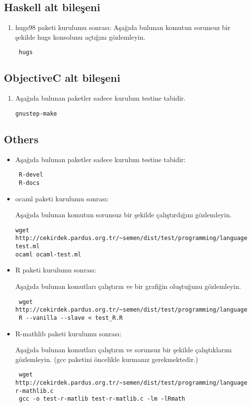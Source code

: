 \documentclass[a4paper,10pt]{article}
\begin{document}
\subsection{Haskell alt bileşeni}
\begin{enumerate}
 \item hugs98 paketi kurulumu sonrası:
Aşağıda bulunan komutun sorunsuz bir şekilde hugs konsolunu açtığını gözlemleyin.
\begin{verbatim}
 hugs
\end{verbatim}

\end{enumerate}

\subsection{ObjectiveC alt bileşeni}
\begin{enumerate}
\item Aşağıda bulunan paketler sadece kurulum testine tabidir.
\begin{verbatim}
gnustep-make
\end{verbatim}

\end{enumerate}


\subsection{Others}
\begin{itemize}
\item Aşağıda bulunan paketler sadece kurulum testine tabidir:

\begin{verbatim}
 R-devel
 R-docs
\end{verbatim}

\item ocaml paketi kurulumu sonrası:

Aşağıda bulunan komutun sorunsuz bir şekilde çalıştırdığını gözlemleyin.
\begin{verbatim}
wget http://cekirdek.pardus.org.tr/~semen/dist/test/programming/language/ocaml-test.ml 
ocaml ocaml-test.ml
\end{verbatim}

 \item R paketi kurulumu sonrası:

Aşağıda bulunan komutları çalıştırın ve bir grafiğin oluştuğunu gözlemleyin.
\begin{verbatim}
 wget http://cekirdek.pardus.org.tr/~semen/dist/test/programming/language/test_R.R
 R --vanilla --slave < test_R.R
\end{verbatim}
\item R-mathlib paketi kurulumu sonrası:

Aşağıda bulunan komutları çalıştırın ve sorunsuz bir şekilde çalıştıklarını gözlemleyin. (gcc paketini öncelikle kurmanız gerekmektedir.)	
\begin{verbatim}
 wget http://cekirdek.pardus.org.tr/~semen/dist/test/programming/language/test-r-mathlib.c
 gcc -o test-r-matlib test-r-matlib.c -lm -lRmath
\end{verbatim}
\end{itemize}
\end{document}

